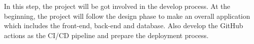 In this step, the project will be got involved in the develop process. 
At the beginning, the project will follow the design phase to make 
an overall application which includes the front-end, back-end and database.
Also develop the GitHub actions as the CI/CD pipeline and prepare the 
deployment process. 
